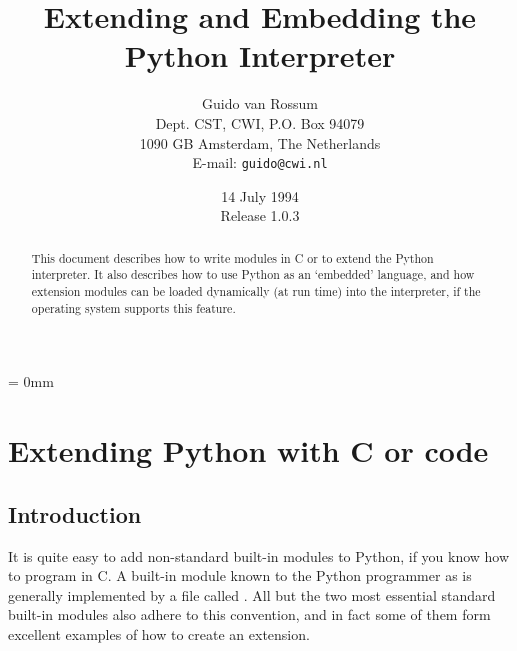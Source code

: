 
\title{Extending and Embedding the Python Interpreter}

\author{
	Guido van Rossum \\
	Dept. CST, CWI, P.O. Box 94079 \\
	1090 GB Amsterdam, The Netherlands \\
	E-mail: {\tt guido@cwi.nl}
}

\date{14 July 1994 \\ Release 1.0.3} %

\makeindex




\maketitle

\begin{abstract}

\noindent
This document describes how to write modules in C or \Cpp{} to extend the
Python interpreter.  It also describes how to use Python as an
`embedded' language, and how extension modules can be loaded
dynamically (at run time) into the interpreter, if the operating
system supports this feature.

\end{abstract}

\pagebreak

{
\parskip = 0mm
\tableofcontents
}

\pagebreak



\chapter{Extending Python with C or \Cpp{} code}


\section{Introduction}

It is quite easy to add non-standard built-in modules to Python, if
you know how to program in C.  A built-in module known to the Python
programmer as  is generally implemented by a file called
.  All but the two most essential standard built-in
modules also adhere to this convention, and in fact some of them form
excellent examples of how to create an extension.

